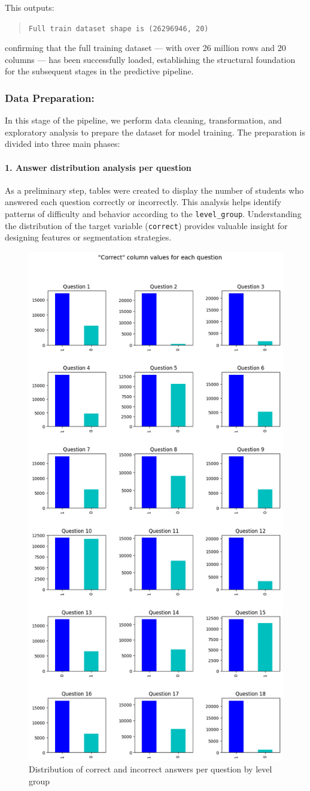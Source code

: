 \documentclass[12pt]{article}
\begin{document}
	
	This outputs:
	
	\begin{quote}
		\texttt{Full train dataset shape is (26296946, 20)}
	\end{quote}
	
	confirming that the full training dataset --- with over 26 million rows and 20 columns --- has been successfully loaded, establishing the structural foundation for the subsequent stages in the predictive pipeline.
	
	
	
	\subsubsection{Data Preparation:}
	In this stage of the pipeline, we perform data cleaning, transformation, and exploratory analysis to prepare the dataset for model training. The preparation is divided into three main phases:
	
	\paragraph{1. Answer distribution analysis per question}
	
	As a preliminary step, tables were created to display the number of students who answered each question correctly or incorrectly. This analysis helps identify patterns of difficulty and behavior according to the \texttt{level\_group}. Understanding the distribution of the target variable (\texttt{correct}) provides valuable insight for designing features or segmentation strategies.
	
	\begin{figure}[H]
		\centering
		\includegraphics[width=0.3\linewidth]{src/PQR.png}
		\caption{Distribution of correct and incorrect answers per question by level group}
		\label{fig:answer-distribution}
	\end{figure}
	
\end{document}
